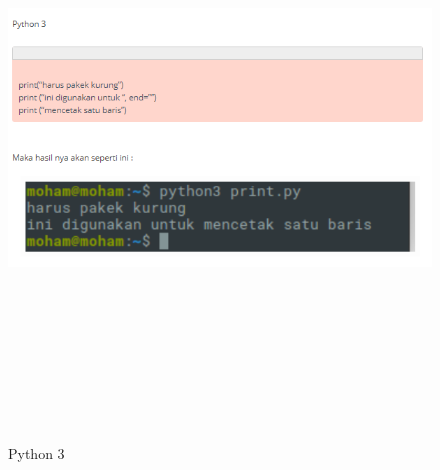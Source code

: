 \begin{enumerate}
\begin{figure}[!htbp]
\centering
\includegraphics[width=15cm,height=16cm]{figures/2.PNG}
\caption{Python 3}
\label{penanda}
\end{figure}


\end{enumerate}
